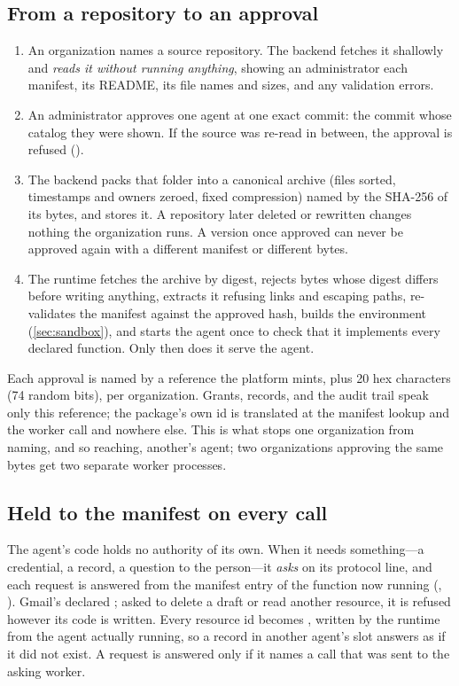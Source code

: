 \subsection{From a repository to an approval}

\begin{enumerate}[leftmargin=1.4em]
\item An organization names a source repository. The backend fetches
  it shallowly and \emph{reads it without running anything}, showing an
  administrator each manifest, its README, its file names and sizes, and
  any validation errors.
\item An administrator approves one agent at one exact commit: the
  commit whose catalog they were shown. If the source was re-read in
  between, the approval is refused ().
\item The backend packs that folder into a canonical archive (files
  sorted, timestamps and owners zeroed, fixed compression) named by the
  SHA-256 of its bytes, and stores it. A repository later deleted or
  rewritten changes nothing the organization runs. A version once
  approved can never be approved again with a different manifest or
  different bytes.
\item The runtime fetches the archive by digest, rejects bytes whose
  digest differs before writing anything, extracts it refusing links
  and escaping paths, re-validates the manifest against the approved
  hash, builds the environment (\cref{sec:sandbox}), and starts the
  agent once to check that it implements every declared function. Only
  then does it serve the agent.
\end{enumerate}

\noindent Each approval is named by a reference the platform mints,
 plus 20 hex characters (74 random bits), per
organization. Grants,
records, and the audit trail speak only this reference; the package's
own id is translated at the manifest lookup and the worker call and
nowhere else. This is what stops one organization from naming, and so
reaching, another's agent; two organizations approving the same bytes
get two separate worker processes.

\subsection{Held to the manifest on every call}

The agent's code holds no authority of its own. When it needs
something---a credential, a record, a question to the person---it
\emph{asks} on its protocol line, and each request is answered from
the manifest entry of the function now running
(, ).
Gmail's  declared ; asked to
delete a draft or read another resource, it is refused however its code
is written. Every resource id becomes , written
by the runtime from the agent actually running, so a record in another
agent's slot answers as if it did not exist. A request is answered only
if it names a call that was sent to the asking worker.

